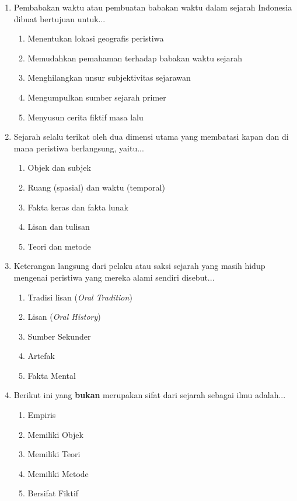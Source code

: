 \documentclass[12pt, a4paper]{article}
\begin{document}
\begin{enumerate}[label=\arabic*.]
    \item Pembabakan waktu atau pembuatan babakan waktu dalam sejarah Indonesia dibuat bertujuan untuk...
    \begin{enumerate}[label=\Alph*.]
        \item Menentukan lokasi geografis peristiwa
        \item Memudahkan pemahaman terhadap babakan waktu sejarah
        \item Menghilangkan unsur subjektivitas sejarawan
        \item Mengumpulkan sumber sejarah primer
        \item Menyusun cerita fiktif masa lalu
    \end{enumerate}

    \item Sejarah selalu terikat oleh dua dimensi utama yang membatasi kapan dan di mana peristiwa berlangsung, yaitu...
    \begin{enumerate}[label=\Alph*.]
        \item Objek dan subjek
        \item Ruang (spasial) dan waktu (temporal)
        \item Fakta keras dan fakta lunak
        \item Lisan dan tulisan
        \item Teori dan metode
    \end{enumerate}

    \item Keterangan langsung dari pelaku atau saksi sejarah yang masih hidup mengenai peristiwa yang mereka alami sendiri disebut...
    \begin{enumerate}[label=\Alph*.]
        \item Tradisi lisan (\textit{Oral Tradition})
        \item Lisan (\textit{Oral History})
        \item Sumber Sekunder
        \item Artefak
        \item Fakta Mental
    \end{enumerate}

    \item Berikut ini yang \textbf{bukan} merupakan sifat dari sejarah sebagai ilmu adalah...
    \begin{enumerate}[label=\Alph*.]
        \item Empiris
        \item Memiliki Objek
        \item Memiliki Teori
        \item Memiliki Metode
        \item Bersifat Fiktif
    \end{enumerate}


\end{enumerate}
\end{document}
